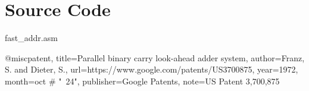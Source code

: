 \documentclass[journal]{IEEEtran}
\begin{document}
\section{Source Code}\label{sec:code}


{fast_addr.asm}

\begin{thebibliography}{99}

	@misc{patent,
	  title={Parallel binary carry look-ahead adder system},
	  author={Franz, S. and Dieter, S.},
	  url={https://www.google.com/patents/US3700875},
	  year={1972},
	  month=oct \# "~24",
	  publisher={Google Patents},
	  note={US Patent 3,700,875}
	}


\end{thebibliography}
\end{document}
